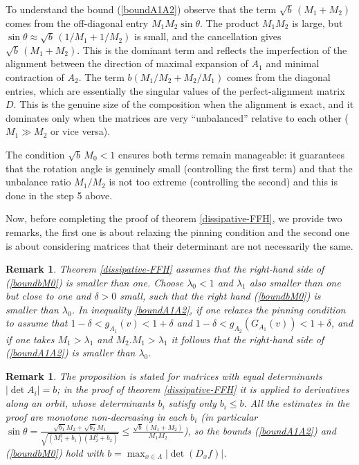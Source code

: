 \documentclass[a4paper,11pt]{article}
\newtheorem{remark}[lemma]{Remark}
\theoremstyle{definition}
\def\La{\Lambda}
\def\la{\lambda}
\def\de{\delta}
\def\La{\Lambda}
\begin{document}
\vskip 5pt


\medskip

To understand the bound (\ref{boundA1A2}) observe that the term $\sqrt b\,(M_1+M_2)$  comes from the off-diagonal entry $M_1 M_2 \sin\theta$. The product $M_1 M_2$ is large, but $\sin\theta \approx \sqrt b\,(1/M_1 + 1/M_2)$ is small, and the cancellation gives $\sqrt b\,(M_1+M_2)$. This is the dominant term and reflects the imperfection of the alignment between the direction of maximal expansion of $A_1$ and minimal contraction of $A_2.$
 The  term $b(M_1/M_2 + M_2/M_1)$  comes from the diagonal entries, which are essentially the singular values of the perfect-alignment matrix $D$. This is the genuine size of the composition when the alignment is exact, and it dominates only when the matrices are very ``unbalanced'' relative to each other ($M_1 \gg M_2$ or vice versa).

 The condition $\sqrt b\,M_0 < 1$ ensures both terms remain manageable: it guarantees that the rotation angle is genuinely small (controlling the first term) and that the unbalance ratio $M_1/M_2$ is not too extreme (controlling the second) and this is done in the step 5 above.

 Now, before completing the proof of theorem \ref{dissipative-FFH}, we provide two remarks, the first one is about relaxing the pinning condition and the second one is about considering matrices that their determinant are not necessarily the same.


\begin{remark}\label{rmk:pinning} Theorem \ref{dissipative-FFH} assumes that the right-hand side of (\ref{boundbM0}) is smaller than one. Choose $\la_0<1$ and $\la_1$ also smaller than one but close to one and $\de>0$ small,  such that the right hand  (\ref{boundbM0}) is smaller than $\la_0$. In  inequality \ref{boundA1A2}, if one relaxes  the pinning condition to assume  that $1-\de < g_{A_1}(v)< 1+\de$ and $1-\de < g_{A_2}(G_{A_1}(v))< 1+\de$, and   if one  takes $M_1>\la_1$ and $M_2.M_1>\la_1$ it follows that the right-hand side of (\ref{boundA1A2}) is smaller than $\la_0.$ 
    
\end{remark}


\begin{remark}\label{rmk:det-normalization}
The proposition is stated for matrices with equal determinants $|\det
A_i|=b$; in the proof of theorem \ref{dissipative-FFH} it is applied to
derivatives along an orbit, whose determinants $b_i$ satisfy only $b_i\leq
b$. All the estimates in the proof are monotone non-decreasing in each
$b_i$ (in particular $\sin\theta=\frac{\sqrt{b_1}M_2+\sqrt{b_2}M_1}
{\sqrt{(M_1^2+b_1)(M_2^2+b_2)}}\leq\frac{\sqrt
b\,(M_1+M_2)}{M_1M_2}$), so the bounds (\ref{boundA1A2}) and
(\ref{boundbM0}) hold with $b=\max_{x\in\La}|\det(D_xf)|$.
\end{remark}
\end{document}
